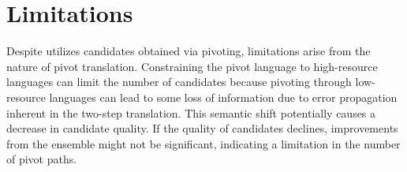 \section*{Limitations}


Despite \ours utilizes candidates obtained via pivoting, limitations arise from the nature of pivot translation.
Constraining the pivot language to high-resource languages can limit the number of candidates because pivoting through low-resource languages can lead to some loss of information due to error propagation inherent in the two-step translation.
This semantic shift potentially causes a decrease in candidate quality. 
If the quality of candidates declines, improvements from the ensemble might not be significant, indicating a limitation in the number of pivot paths.
